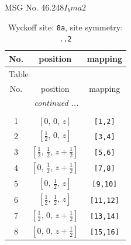 \documentclass[fleqn,8pt]{jsarticle}
\begin{document}
\setcounter{MaxMatrixCols}{32}

\renewcommand{\tablename}{Table~}
\renewcommand{\figurename}{Figure~}
\begin{center}
\LARGE
MSG No. 46.248\quad$I_{b}ma2$
\end{center}
\renewcommand{\arraystretch}{1.2}
\begin{longtable}{ccc}
\caption{Wyckoff site: {\tt 8a}, site symmetry: {\tt ..2}}
 \\
 \hline \hline
No. & position & mapping \\ \hline \endfirsthead

\multicolumn{2}{l}{\tablename\ \thetable{}} \\
 \hline \hline
No. & position & mapping \\ \hline \endhead

 \hline \hline
\multicolumn{2}{r}{\footnotesize\it continued ...} \\ \endfoot

 \hline \hline
\multicolumn{2}{r}{} \\ \endlastfoot

1 & $\left[ 0,\, 0,\, z \right]$ & {\tt [1,2]} \\ \hline
2 & $\left[ \frac{1}{2},\, 0,\, z \right]$ & {\tt [3,4]} \\ \hline
3 & $\left[ \frac{1}{2},\, \frac{1}{2},\, z + \frac{1}{2} \right]$ & {\tt [5,6]} \\ \hline
4 & $\left[ 0,\, \frac{1}{2},\, z + \frac{1}{2} \right]$ & {\tt [7,8]} \\ \hline
5 & $\left[ 0,\, \frac{1}{2},\, z \right]$ & {\tt [9,10]} \\ \hline
6 & $\left[ \frac{1}{2},\, \frac{1}{2},\, z \right]$ & {\tt [11,12]} \\ \hline
7 & $\left[ \frac{1}{2},\, 0,\, z + \frac{1}{2} \right]$ & {\tt [13,14]} \\ \hline
8 & $\left[ 0,\, 0,\, z + \frac{1}{2} \right]$ & {\tt [15,16]} \\
\end{longtable}
\renewcommand{\arraystretch}{1.2}
\end{document}
